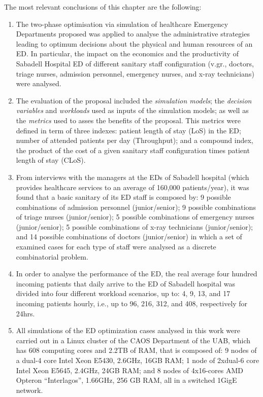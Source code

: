 \documentclass[11pt]{article} %
\begin{document}
The most relevant conclusions of this chapter are the following:
\begin{enumerate}
\item The two-phase optimisation via simulation of healthcare Emergency
Departments proposed was applied to analyse the administrative strategies
leading to optimum decisions about the physical and human resources
of an ED. In particular, the impact on the economics and the productivity
of Sabadell Hospital ED of different sanitary staff configuration
(v.gr., doctors, triage nurses, admission personnel, emergency nurses,
and x-ray technicians) were analysed.\\

\item The evaluation of the proposal included the \textit{simulation models};
the \textit{decision variables} and\textit{ workloads} used as inputs
of the simulation models; as well as the \textit{metrics} used to
asses the benefits of the proposal. This metrics were defined in term
of three indexes: patient length of stay (LoS) in the ED; number of
attended patients per day (Throughput); and a compound index, the
product of the cost of a given sanitary staff configuration times
patient length of stay (CLoS).\\

\item From interviews with the managers at the EDs of Sabadell hospital
(which provides healthcare services to an average of 160,000 patients/year),
it was found that a basic sanitary of its ED staff is composed by:
9 possible combinations of admission personnel (junior/senior); 9
possible combinations of triage nurses (junior/senior); 5 possible
combinations of emergency nurses (junior/senior); 5 possible combinations
of x-ray technicians (junior/senior); and 14 possible combinations
of doctors (junior/senior) in which a set of examined cases for each
type of staff were analysed as a discrete combinatorial problem.\\

\item In order to analyse the performance of the ED, the real average four
hundred incoming patients that daily arrive to the ED of Sabadell
hospital was divided into four different workload scenarios, up to:
4, 9, 13, and 17 incoming patients hourly, i.e., up to 96, 216, 312,
and 408, respectively for 24hrs.\\

\item All simulations of the ED optimization cases analysed in this work
were carried out in a Linux cluster of the CAOS Department of the
UAB, which has 608 computing cores and 2.2TB of RAM, that is composed
of: 9 nodes of a dual-4 core Intel Xeon E5430, 2.6GHz, 16GB RAM; 1
node of 2xdual-6 core Intel Xeon E5645, 2.4GHz, 24GB RAM; and 8 nodes
of 4x16-cores AMD Opteron ``Interlagos'', 1.66GHz, 256 GB RAM, all
in a switched 1GigE network.\\


\end{enumerate}
\end{document}
